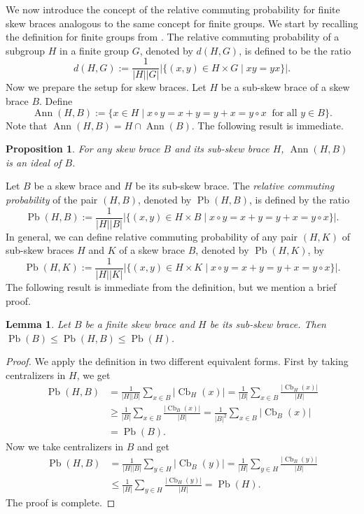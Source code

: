 \documentclass[11pt, oneside]{amsart}
\numberwithin{equation}{section}
\theoremstyle{plain}
\newtheorem{pro}[equation]{Proposition}
\newtheorem{lem}[equation]{Lemma}
\theoremstyle{definition}
\newcommand{\Cb}{\operatorname{Cb} }
\newcommand{\Pb}{\operatorname{Pb} }
\newcommand{\Ann}{\operatorname{Ann} }
\begin{document}
We now introduce the  concept of the relative commuting probability for finite skew braces analogous to the same concept for finite groups. We start by recalling the definition for finite groups  from  \cite{ERL07}. The relative commuting probability of a subgroup $H$ in a finite group $G$,  denoted by $d(H, G)$, is  defined to be  the ratio
   $$d(H,G) := \frac{1}{|H||G|}|\{(x,y)\in H\times G \mid xy=yx\}|.$$
Now we prepare the setup for skew braces. Let $H$ be a sub-skew brace of a skew brace $B$.
Define $$\Ann(H,B) := \{x \in H \mid x \circ y = x + y = y + x = y \circ x~\mbox{ for all }  y \in B\}.$$
Note that $\Ann(H, B) = H \cap \Ann(B)$.  The following result is immediate. 
\begin{pro}
  For any skew brace $B$ and its sub-skew brace $H$,    $\Ann(H,B)$ is an ideal of $B$.
\end{pro}


 Let  $B$ be a skew brace  and $H$ be its sub-skew brace.    The \emph{relative commuting probability} of the pair  $(H, B)$, denoted by  $\Pb(H,B)$, is defined by the ratio
   $$\Pb(H,B) :=\frac{1}{|H||B|}|\{(x,y)\in H\times B \mid  x \circ y = x + y = y + x = y \circ x\}|.$$
  In general,  we can define relative commuting probability of any pair  $(H, K)$ of sub-skew braces $H$ and $K$ of a skew brace $B$, denoted by  $\Pb(H,K)$, by
       $$\Pb(H,K) :=\frac{1}{|H||K|}  |\{(x,y) \in H \times K \mid x \circ y = x + y = y + x = y \circ x\}|.$$
The following result is immediate   from the definition, but we mention a brief proof.    

\begin{lem} %
    Let $B$ be a finite skew brace and $H$ be its sub-skew brace. Then   $\Pb(B)\leqslant \Pb(H,B)\leqslant \Pb(H)$.
\end{lem}
\begin{proof}
We apply the definition in two different equivalent forms. First by taking centralizers in $H$, we get
      \begin{align*}
            \Pb(H,B)&=\frac{1}{|H||B|}\sum_{x\in B}|\Cb_{H}(x)| = \frac{1}{|B|}\sum_{x\in B}\frac{|\Cb_{H}(x)|}{|H|}\\
                     &\geqslant \frac{1}{|B|}\sum_{x\in B}\frac{|\Cb_{B}(x)|}{|B|} =\frac{1}{|B|^2}\sum_{x\in B}|\Cb_{B}(x)|\\
                     &=\Pb(B).
      \end{align*}
 Now we take centralizers in $B$ and get
      \begin{align*}
            \Pb(H,B)&=\frac{1}{|H||B|}\sum_{y\in H}|\Cb_{B}(y)| =\frac{1}{|H|}\sum_{y\in H}\frac{|\Cb_{B}(y)|}{|B|}\\
                     &\leqslant\frac{1}{|H|}\sum_{y\in H}\frac{|\Cb_{H}(y)|}{|H|}=\Pb(H). 
      \end{align*}
      The proof is complete.
\end{proof}
\end{document}
